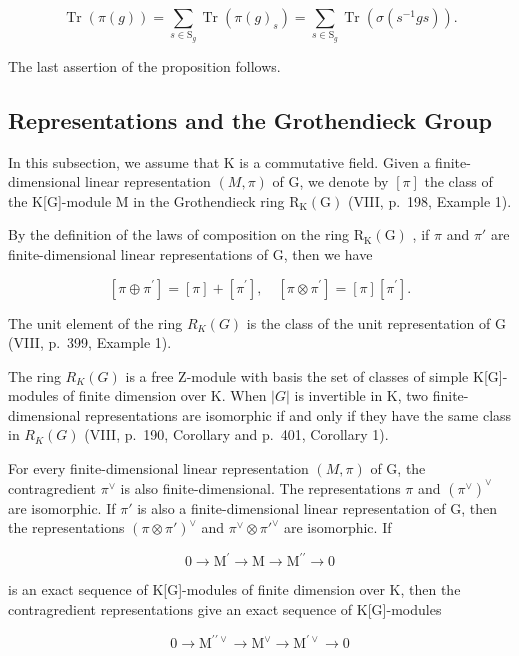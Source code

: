 \[
\operatorname{Tr} (\pi (g)) = \sum_ {s \in \mathrm{S} _ {g}} \operatorname{Tr} (\pi (g) _ {s}) = \sum_ {s \in \mathrm{S} _ {g}} \operatorname{Tr} (\sigma (s ^ {- 1} g s)).
\]

The last assertion of the proposition follows.

\subsection{Representations and the Grothendieck Group}

In this subsection, we assume that K is a commutative field. Given a finite-dimensional linear representation \((M,\pi)\) of G, we denote by \([\pi]\) the class of the K{[}G{]}-module M in the Grothendieck ring \(\mathrm{R}_{\mathrm{K}}(\mathrm{G})\) (VIII, p.~198, Example 1).

By the definition of the laws of composition on the ring \(\mathrm{R}_{\mathrm{K}}(\mathrm{G})\) , if \(\pi\) and \(\pi'\) are finite-dimensional linear representations of G, then we have

\[
[ \pi \oplus \pi^ {\prime} ] = [ \pi ] + [ \pi^ {\prime} ], \quad [ \pi \otimes \pi^ {\prime} ] = [ \pi ] [ \pi^ {\prime} ].
\]

The unit element of the ring \(R_{K}(G)\) is the class of the unit representation of G (VIII, p.~399, Example 1).

The ring \(R_{K}(G)\) is a free Z-module with basis the set of classes of simple K{[}G{]}-modules of finite dimension over K. When \(|G|\) is invertible in K, two finite-dimensional representations are isomorphic if and only if they have the same class in \(R_{K}(G)\) (VIII, p.~190, Corollary and p.~401, Corollary 1).

For every finite-dimensional linear representation \((M,\pi)\) of G, the contragredient \(\pi^{\vee}\) is also finite-dimensional. The representations \(\pi\) and \((\pi^{\vee})^{\vee}\) are isomorphic. If \(\pi'\) is also a finite-dimensional linear representation of G, then the representations \((\pi\otimes\pi')^{\vee}\) and \(\pi^{\vee}\otimes\pi'^{\vee}\) are isomorphic. If

\[
0 \longrightarrow \mathrm{M} ^ {\prime} \longrightarrow \mathrm{M} \longrightarrow \mathrm{M} ^ {\prime \prime} \longrightarrow 0
\]

is an exact sequence of K{[}G{]}-modules of finite dimension over K, then the contragredient representations give an exact sequence of K{[}G{]}-modules

\[
0 \longrightarrow \mathrm{M} ^ {\prime \prime \vee} \longrightarrow \mathrm{M} ^ {\vee} \longrightarrow \mathrm{M} ^ {\prime \vee} \longrightarrow 0
\]

